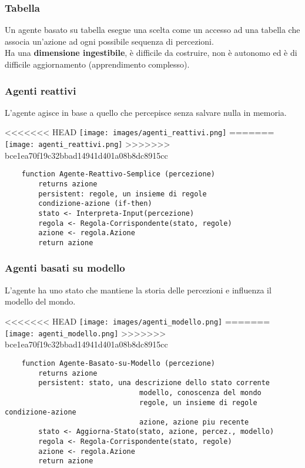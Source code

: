 \subsubsection{Tabella}
Un agente basato su tabella esegue una scelta come un accesso ad una tabella che associa un'azione ad ogni possibile sequenza di percezioni.\\
Ha una \textbf{dimensione ingestibile}, è difficile da costruire, non è autonomo ed è di difficile aggiornamento (apprendimento complesso).

\subsubsection{Agenti reattivi}
L'agente agisce in base a quello che percepisce senza salvare nulla in memoria.
\begin{center}
<<<<<<< HEAD
	\texttt{[image: images/agenti\_reattivi.png]}
=======
	\texttt{[image: agenti\_reattivi.png]}
>>>>>>> bce1ea70f19c32bbad14941d401a08b8dc8915cc
\end{center}
\begin{lstlisting}
	function Agente-Reattivo-Semplice (percezione)
		returns azione
		persistent: regole, un insieme di regole
		condizione-azione (if-then)
		stato <- Interpreta-Input(percezione)
		regola <- Regola-Corrispondente(stato, regole)
		azione <- regola.Azione
		return azione
\end{lstlisting}

\subsubsection{Agenti basati su modello}
L'agente ha uno stato che mantiene la storia delle percezioni e influenza il modello del mondo.
\begin{center}
<<<<<<< HEAD
	\texttt{[image: images/agenti\_modello.png]}
=======
	\texttt{[image: agenti\_modello.png]}
>>>>>>> bce1ea70f19c32bbad14941d401a08b8dc8915cc
\end{center}
\begin{lstlisting}
	function Agente-Basato-su-Modello (percezione)
		returns azione
		persistent: stato, una descrizione dello stato corrente
								modello, conoscenza del mondo
								regole, un insieme di regole condizione-azione
								azione, azione piu recente
		stato <- Aggiorna-Stato(stato, azione, percez., modello)
		regola <- Regola-Corrispondente(stato, regole)
		azione <- regola.Azione
		return azione
\end{lstlisting}


